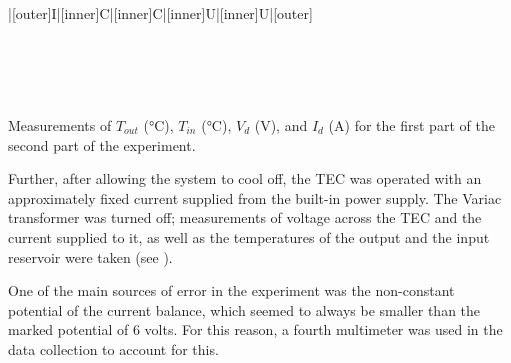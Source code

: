 \begin{paper}
{\begin{papertable}{|[outer]I|[inner]C|[inner]C|[inner]U|[inner]U|[outer]}
\papertableindex{}\\\paperiline
\papertableindex{}\\\paperiline
\papertableindex{}\\\paperiline
\papertableindex{}\\\paperiline
\papertableindex{}\\\paperoline
\end{papertable}\vspace{-0.5em}}{Measurements of $T_{out}$ ($\si{\celsius}$), $T_{in}$ ($\si{\celsius}$), $V_d$ ($\si{\volt}$), and $I_d$ ($\si{\ampere}$) for the first part of the second part of the experiment.}

	Further, after allowing the system to cool off, the TEC was operated with an approximately fixed current supplied from the built-in power supply. The Variac transformer was turned off; measurements of voltage across the TEC and the current supplied to it, as well as the temperatures of the output and the input reservoir were taken (see \figPartTwoA).
	
	One of the main sources of error in the experiment was the non-constant potential of the current balance, which seemed to always be smaller than the marked potential of 6 volts. For this reason, a fourth multimeter was used in the data collection to account for this.


\end{paper}
